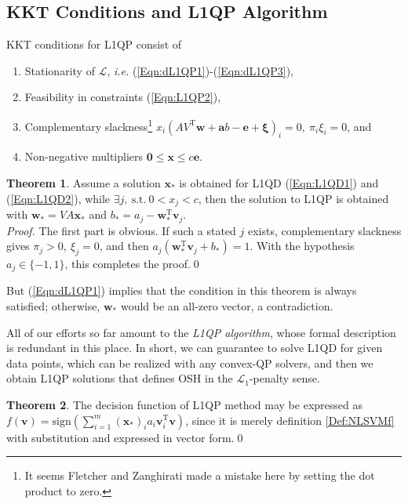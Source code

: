 \documentclass[11pt,a4paper]{article}
\theoremstyle{definition}
\newtheorem{theo}{Theorem}
\renewcommand{\vec}[1]{\boldsymbol{#1}}
\begin{document}
    \subsection{KKT Conditions and L1QP Algorithm\label{Sec:KKTL1Algo}}
      KKT conditions for L1QP consist of
      \begin{enumerate}
        \item Stationarity of $\mathcal{L}$, \textit{i.e.} (\ref{Eqn:dL1QP1})-(\ref{Eqn:dL1QP3}),
        \item Feasibility in constraints (\ref{Eqn:L1QP2}),
        \item Complementary slackness\footnote{It seems Fletcher and Zanghirati \cite{fletcher2010binary} made a mistake here by setting the dot product to zero.} $x_{i}(AV^{\mathrm{T}}\vec{w}+\vec{a}b-\vec{e}+\vec{\xi})_{i}=0,~\pi_{i}\xi_{i}=0$, and
        \item Non-negative multipliers $\vec{0}\leq\vec{x}\leq c\vec{e}$.
      \end{enumerate}

      \begin{theo}
        Assume a solution $\vec{x}_{*}$ is obtained for L1QD (\ref{Eqn:L1QD1}) and (\ref{Eqn:L1QD2}), while $\exists j,~\text{s.t.}~0<x_{j}<c$, then the solution to L1QP is obtained with $\vec{w}_{*}=VA\vec{x}_{*}$ and $b_{*}=a_{j}-\vec{w}_{*}^{\mathrm{T}}\vec{v}_{j}$.\\
        \textit{Proof.} The first part is obvious. If such a stated $j$ exists, complementary slackness gives $\pi_{j}>0,~\xi_{j}=0$, and then $a_{j}(\vec{w}_{*}^{\mathrm{T}}\vec{v}_{j}+b_{*})=1$. With the hypothesis $a_{j}\in\{-1,1\}$, this completes the proof.\qed
      \end{theo}
      But (\ref{Eqn:dL1QP1}) implies that the condition in this theorem is always satisfied; otherwise, $\vec{w}_{*}$ would be an all-zero vector, a contradiction.

      All of our efforts so far amount to the \textit{L1QP algorithm}, whose formal description is redundant in this place. In short, we can guarantee to solve L1QD for given data points, which can be realized with any convex-QP solvers, and then we obtain L1QP solutions that defines OSH in the $\mathcal{L}_{1}$-penalty sense.

      \begin{theo}
        The decision function of L1QP method may be expressed as $f(\vec{v})=\text{sign}(\sum_{i=1}^{m}(\vec{x}_{*})_{i}a_{i}\vec{v}_{i}^{\mathrm{T}}\vec{v})$, since it is merely definition \ref{Def:NLSVMf} with substitution and expressed in vector form.\qed
      \end{theo}
\end{document}
